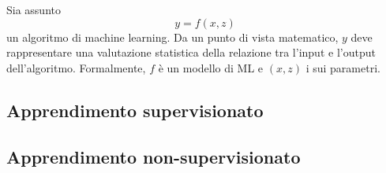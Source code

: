 \documentclass{subfiles}
\begin{document}
\label{sec:3}
Sia assunto
$$
    y = f(x, z)
$$
un algoritmo di machine learning.
Da un punto di vista matematico, $y$ deve rappresentare una valutazione statistica della relazione tra l'input e l'output dell'algoritmo.
Formalmente, $f$ è un modello di ML e $(x, z)$ i sui parametri.

\subsection{Apprendimento supervisionato}


\subsection{Apprendimento non-supervisionato}

\end{document}

